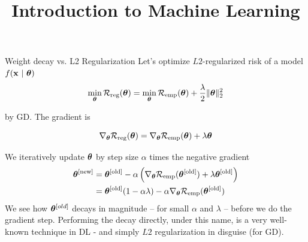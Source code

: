 \documentclass[11pt,compress,t,notes=noshow, xcolor=table]{beamer}
\title{Introduction to Machine Learning}
\begin{document}




\begin{vbframe}{Weight decay vs. L2 Regularization}
Let's optimize $L2$-regularized risk of a model $f(\mathbf{x} ~|~ \bm{\theta})$
\vspace{-0.2cm}
\[
\min_{\bm{\theta}} \mathcal{R}_{\text{reg}}(\bm{\theta}) = \min_{\bm{\theta}} \mathcal{R}_{\text{emp}}(\bm{\theta}) + \frac{\lambda}{2} \|\bm{\theta}\|^2_2
\]

by GD. The gradient is

\[
\nabla_{\bm{\theta}} \mathcal{R}_{\text{reg}}(\bm{\theta}) = \nabla_{\bm{\theta}} \mathcal{R}_{\text{emp}}(\bm{\theta}) + \lambda \bm{\theta}
\]

We iteratively update $\bm{\theta}$ by step size \(\alpha\) times the
negative gradient
\vspace{-0.2cm}
\begin{align*}
\bm{\theta}^{[\text{new}]} &= \bm{\theta}^{[\text{old}]} - \alpha \left(\nabla_{\bm{\theta}} \mathcal{R}_{\text{emp}}(\bm{\theta}^{[\text{old}]}) + \lambda \bm{\theta}^{[\text{old}]}\right) \\&=
\bm{\theta}^{[\text{old}]} (1 - \alpha \lambda) - \alpha \nabla_{\bm{\theta}} \mathcal{R}_{\text{emp}}(\bm{\theta}^{[\text{old}]})
\end{align*}
{\small
We see how $\bm{\theta}^{[old]}$ decays in magnitude -- for small $\alpha$ and $\lambda$ -- before we do the gradient step. Performing the decay directly, under this name, is a very well-known technique in DL - and simply $L2$ regularization in disguise (for GD).
}
\framebreak



\end{vbframe}
\end{document}

